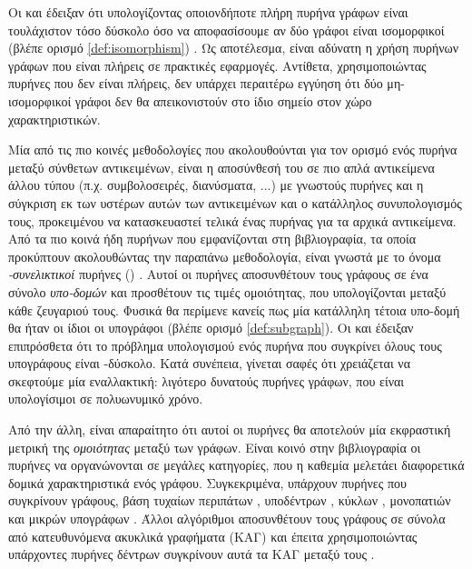 Οι  και  έδειξαν ότι υπολογίζοντας οποιονδήποτε πλήρη πυρήνα γράφων είναι τουλάχιστον τόσο δύσκολο όσο να αποφασίσουμε αν δύο γράφοι είναι ισομορφικοί (βλέπε ορισμό \ref{def:isomorphism}) \cite{Gartner03ongraph}.
Ως αποτέλεσμα, είναι αδύνατη η χρήση πυρήνων γράφων που είναι πλήρεις σε πρακτικές εφαρμογές.
Αντίθετα, χρησιμοποιώντας πυρήνες που δεν είναι πλήρεις, δεν υπάρχει περαιτέρω εγγύηση ότι δύο μη-ισομορφικοί γράφοι δεν θα απεικονιστούν στο ίδιο σημείο στον χώρο χαρακτηριστικών.\par
Μία από τις πιο κοινές μεθοδολογίες που ακολουθούνται για τον ορισμό ενός πυρήνα μεταξύ σύνθετων αντικειμένων, είναι η αποσύνθεσή του σε πιο απλά αντικείμενα άλλου τύπου (π.χ. συμβολοσειρές, διανύσματα, ...) με γνωστούς πυρήνες και η σύγκριση εκ των υστέρων αυτών των αντικειμένων και ο κατάλληλος συνυπολογισμός τους, προκειμένου να κατασκευαστεί τελικά ένας πυρήνας για τα αρχικά αντικείμενα.
Από τα πιο κοινά ήδη πυρήνων που εμφανίζονται στη βιβλιογραφία, τα οποία προκύπτουν ακολουθώντας την παραπάνω μεθοδολογία, είναι γνωστά με το όνομα \textit{-συνελικτικοί} πυρήνες () \cite{Haussler1999ConvolutionKO}.
Αυτοί οι πυρήνες αποσυνθέτουν τους γράφους σε ένα σύνολο \textit{υπο-δομών} και προσθέτουν τις τιμές ομοιότητας, που υπολογίζονται μεταξύ κάθε ζευγαριού τους.
Φυσικά θα περίμενε κανείς πως μία κατάλληλη τέτοια υπο-δομή θα ήταν οι ίδιοι οι υπογράφοι (βλέπε ορισμό \ref{def:subgraph}).
Οι  και  έδειξαν επιπρόσθετα ότι το πρόβλημα υπολογισμού ενός πυρήνα που συγκρίνει όλους τους υπογράφους είναι -δύσκολο.
Κατά συνέπεια, γίνεται σαφές ότι χρειάζεται να σκεφτούμε μία εναλλακτική: λιγότερο δυνατούς πυρήνες γράφων, που είναι υπολογίσιμοι σε πολυωνυμικό χρόνο.\par
Από την άλλη, είναι απαραίτητο ότι αυτοί οι πυρήνες θα αποτελούν μία εκφραστική μετρική της \textit{ομοιότητας} μεταξύ των γράφων.
Είναι κοινό στην βιβλιογραφία οι πυρήνες να οργανώνονται σε μεγάλες κατηγορίες, που η καθεμία μελετάει διαφορετικά δομικά χαρακτηριστικά ενός γράφου.
Συγκεκριμένα, υπάρχουν πυρήνες που συγκρίνουν γράφους, βάση τυχαίων περιπάτων \cite{gartner2003graph, borgwardt2005protein, vishwanathan2010graph}, υποδέντρων \cite{Ramon03expressivityversus, Bach2008, Mahe2009}, κύκλων \cite{Horvath2004}, μονοπατιών \cite{Borgwardt2005, Giscard2017} και μικρών υπογράφων \cite{Costa2010, Hido2009, Kriege2012SubgraphMK, shervashidze2009efficient}.
Άλλοι αλγόριθμοι αποσυνθέτουν τους γράφους σε σύνολα από κατευθυνόμενα ακυκλικά γραφήματα (ΚΑΓ) και έπειτα χρησιμοποιώντας υπάρχοντες πυρήνες δέντρων συγκρίνουν αυτά τα ΚΑΓ μεταξύ τους \cite{Martino2006}.
